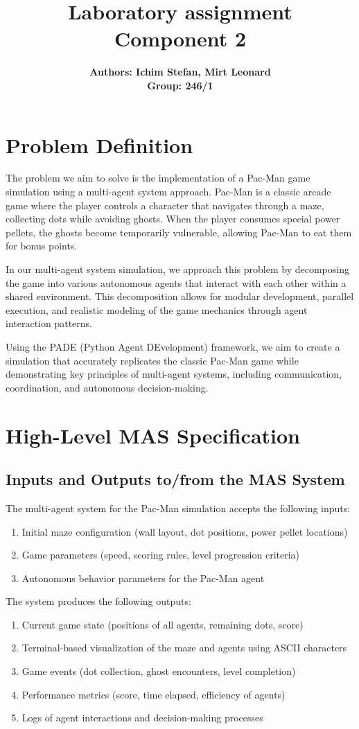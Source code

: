 \documentclass[a4paper, 11pt]{article}
\title{\textbf{Laboratory assignment} \\[1ex] \large \textbf{Component 2}}
\author{\textbf{Authors: Ichim Stefan, Mirt Leonard} \\ \textbf{Group: 246/1}}
\begin{document}
\maketitle
\section{Problem Definition}
The problem we aim to solve is the implementation of a Pac-Man game simulation using a multi-agent system approach. Pac-Man is a classic arcade game where the player controls a character that navigates through a maze, collecting dots while avoiding ghosts. When the player consumes special power pellets, the ghosts become temporarily vulnerable, allowing Pac-Man to eat them for bonus points.

In our multi-agent system simulation, we approach this problem by decomposing the game into various autonomous agents that interact with each other within a shared environment. This decomposition allows for modular development, parallel execution, and realistic modeling of the game mechanics through agent interaction patterns.

Using the PADE (Python Agent DEvelopment) framework, we aim to create a simulation that accurately replicates the classic Pac-Man game while demonstrating key principles of multi-agent systems, including communication, coordination, and autonomous decision-making.

\section{High-Level MAS Specification}

\subsection{Inputs and Outputs to/from the MAS System}

The multi-agent system for the Pac-Man simulation accepts the following inputs:
\begin{enumerate}
    \item Initial maze configuration (wall layout, dot positions, power pellet locations)
    \item Game parameters (speed, scoring rules, level progression criteria)
    \item Autonomous behavior parameters for the Pac-Man agent
\end{enumerate}

The system produces the following outputs:
\begin{enumerate}
    \item Current game state (positions of all agents, remaining dots, score)
    \item Terminal-based visualization of the maze and agents using ASCII characters
    \item Game events (dot collection, ghost encounters, level completion)
    \item Performance metrics (score, time elapsed, efficiency of agents)
    \item Logs of agent interactions and decision-making processes
\end{enumerate}
\end{document}
